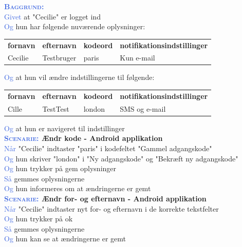 \textsc{\textcolor{RoyalBlue}{\textbf{Baggrund:}}}\\
\textcolor{RoyalBlue}{Givet} at "Cecilie" er logget ind\\
\textcolor{RoyalBlue}{Og} hun har følgende nuværende oplysninger:\\
\begin{tabular}{| l | l | l | l |}
	\textbf{fornavn} & \textbf{efternavn} & \textbf{kodeord} & \textbf{notifikationsindstillinger} \\
	Cecilie & Testbruger & paris & Kun e-mail\\
\end{tabular}
\newline \newline
\textcolor{RoyalBlue}{Og} at hun vil ændre indstillingerne til følgende:\\
\begin{tabular}{| l | l | l | l |}
	\textbf{fornavn} & \textbf{efternavn} & \textbf{kodeord} & \textbf{notifikationsindstillinger} \\
	Cille & TestTest & london & SMS og e-mail\\
\end{tabular}
\newline \newline
\textcolor{RoyalBlue}{Og} at hun er navigeret til indstillinger\\

\textbf{\textsc{\textcolor{RoyalBlue}{Scenarie:}} Ændr kode - Android applikation}\\
\textcolor{RoyalBlue}{Når} "Cecilie" indtaster "paris" i kodefeltet "Gammel adgangskode"\\
\textcolor{RoyalBlue}{Og} hun skriver "london" i "Ny adgangskode" og "Bekræft ny adgangskode"\\
\textcolor{RoyalBlue}{Og} hun trykker på gem oplysninger\\
\textcolor{RoyalBlue}{Så} gemmes oplysningerne\\
\textcolor{RoyalBlue}{Og} hun informeres om at ændringerne er gemt\\

\textbf{\textsc{\textcolor{RoyalBlue}{Scenarie:}} Ændr for- og efternavn - Android applikation}\\
\textcolor{RoyalBlue}{Når} "Cecilie" indtaster nyt for- og efternavn i de korrekte tekstfelter\\
\textcolor{RoyalBlue}{Og} hun trykker på ok\\
\textcolor{RoyalBlue}{Så} gemmes oplysningerne\\
\textcolor{RoyalBlue}{Og} hun kan se at ændringerne er gemt\\

